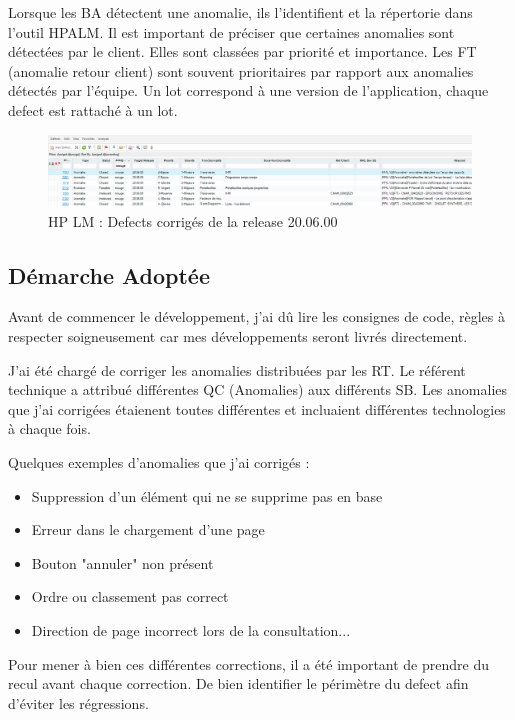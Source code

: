 Lorsque les BA détectent une anomalie, ils l'identifient et la répertorie dans l'outil HPALM. Il est important de préciser que certaines anomalies sont détectées par le client. Elles sont classées par priorité et importance.
Les FT (anomalie retour client) sont souvent prioritaires par rapport aux anomalies détectés par l'équipe.
Un lot correspond à une version de l'application, chaque defect est rattaché à un lot.

\begin{figure}[h]
\centering
\includegraphics[width=1\textwidth]{images/HPLMliste.png}
\caption{HP LM : Defects corrigés de la release 20.06.00}
\end{figure}

\subsection{Démarche Adoptée}

Avant de commencer le développement, j'ai dû lire les consignes de code, règles à respecter soigneusement car mes développements seront livrés directement.

J'ai été chargé de corriger les anomalies distribuées par les RT.
Le référent technique a attribué différentes QC (Anomalies) aux différents SB. 
Les anomalies que j'ai corrigées étaienent toutes différentes et incluaient différentes technologies à chaque fois.

Quelques exemples d'anomalies que j'ai corrigés : 
\begin{itemize}
    \item Suppression d'un élément qui ne se supprime pas en base
    \item Erreur dans le chargement d'une page
    \item Bouton "annuler" non présent
    \item Ordre ou classement pas correct
    \item Direction de page incorrect lors de la consultation...
\end{itemize}

Pour mener à bien ces différentes corrections, il a été important de prendre du recul avant chaque correction. De bien identifier le périmètre du defect afin d'éviter les régressions.

